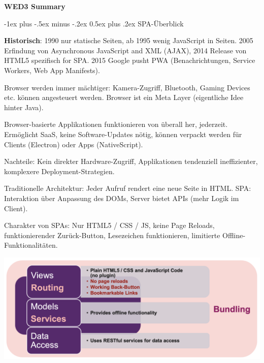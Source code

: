 \documentclass[10pt,landscape]{article}
\makeatletter
\renewcommand{\section}{\@startsection{section}{1}{0mm}%
{-1ex plus -.5ex minus -.2ex}%
{0.5ex plus .2ex}%
{\normalfont\large\bfseries}}
\makeatother
\begin{document}
    \raggedright
    \footnotesize
    \begin{multicols}{2}


        \setlength{\premulticols}{1pt}
        \setlength{\postmulticols}{1pt}
        \setlength{\multicolsep}{1pt}
        \setlength{\columnsep}{2pt}

        \begin{center}
            \Large{\textbf{WED3 Summary}} \\
        \end{center}


        \section{SPA-Überblick}

        \textbf{Historisch}: 1990 nur statische Seiten, ab 1995 wenig JavaScript in Seiten.
        2005 Erfindung von Asynchronous JavaScript and XML (AJAX), 2014 Release von HTML5 spezifisch for SPA.
        2015 Google pusht PWA (Benachrichtungen, Service Workers, Web App Manifests).

        Browser werden immer mächtiger: Kamera-Zugriff, Bluetooth, Gaming Devices etc. können angesteuert werden.
        Browser ist ein Meta Layer (eigentliche Idee hinter Java).

        Browser-basierte Applikationen funktionieren von überall her, jederzeit.
        Ermöglicht SaaS, keine Software-Updates nötig, können verpackt werden für Clients (Electron) oder Apps (NativeScript).

        Nachteile: Kein direkter Hardware-Zugriff, Applikationen tendenziell ineffizienter, komplexere Deployment-Strategien.

        Traditionelle Architektur: Jeder Aufruf rendert eine neue Seite in HTML.
        SPA: Interaktion über Anpassung des DOMs, Server bietet APIs (mehr Logik im Client).

        Charakter von SPAs: Nur HTML5 / CSS / JS, keine Page Reloads, funktionierender Zurück-Button, Lesezeichen funktionieren, limitierte Offline-Funktionalitäten.

        \includegraphics[width=\linewidth]{spa_logical_overview}


\end{multicols}
\end{document}

